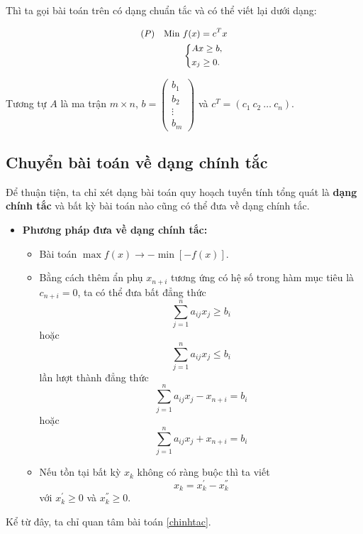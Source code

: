 \documentclass[12pt,a4paper]{report}
\begin{document}
\begin{itemize}
    Thì ta gọi bài toán trên có dạng chuẩn tắc và có thể viết lại dưới dạng:

    \begin{equation} \small \label{F}
        \begin{split}
        (P) \quad \text{Min } & f(x) = c^Tx \\
            & \left\{
            \begin{split}
            & Ax \geq b, \\
            & x_j \geq 0.
            \end{split}
            \right.    
        \end{split}
    \end{equation}

    Tương tự $A$ là ma trận $m\times n$, $b=\begin{pmatrix}
        b_1 \\
        b_2 \\
        \vdots \\
        b_m
        \end{pmatrix}$ và $c^T=(c_1 \: c_2 \: \ldots \: c_n)$.

\end{itemize}

\subsection{Chuyển bài toán về dạng chính tắc}

Để thuận tiện, ta chỉ xét dạng bài toán quy hoạch tuyến tính tổng quát là \textbf{dạng chính tắc} và bất kỳ bài toán nào cũng có thể đưa về dạng chính tắc.

\begin{itemize}
\item \textbf{Phương pháp đưa về dạng chính tắc:}
    \begin{itemize}
    \item Bài toán $\max f(x) \longrightarrow -\min [-f(x)]$.
    \item Bằng cách thêm ẩn phụ $x_{n+i}$ tương ứng có hệ số trong hàm mục tiêu là $c_{n+i}=0$, ta có thể đưa bất đẳng thức 
    \begin{equation*}
    \sum _{j=1}^n a_{ij} x_j \geq b_i
    \end{equation*}
    hoặc
    \begin{equation*}
    \sum _{j=1}^n a_{ij} x_j \leq b_i
    \end{equation*}
    lần lượt thành đẳng thức
    \begin{equation*}
    \sum _{j=1}^n a_{ij} x_j - x_{n+i} = b_i
    \end{equation*}
    hoặc
    \begin{equation*}
    \sum _{j=1}^n a_{ij} x_j + x_{n+i} = b_i
    \end{equation*}
    \item Nếu tồn tại bất kỳ $x_k$ không có ràng buộc thì ta viết
    \begin{equation*}
    x_k = x_k^{'} - x_k^{''}
    \end{equation*}
    với $x_k^{'} \geq 0$ và $x_k^{''} \geq 0$.
    \end{itemize}
\end{itemize}
Kể từ đây, ta chỉ quan tâm bài toán \eqref{chinhtac}.
\end{document}
